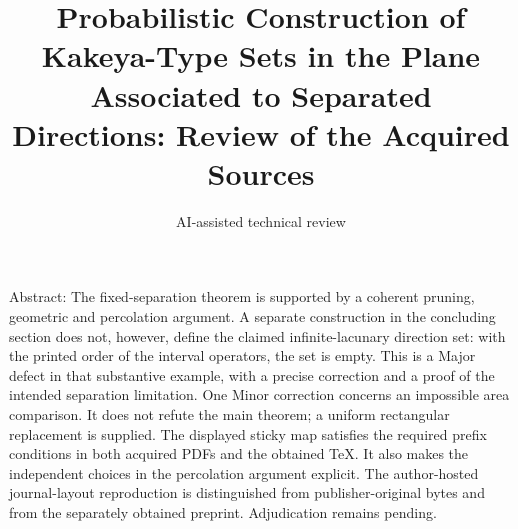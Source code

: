 \documentclass[10pt]{article}
\title{Probabilistic Construction of Kakeya-Type Sets in the Plane Associated to Separated Directions:
Review of the Acquired Sources}
\author{AI-assisted technical review}
\date{}
\begin{document}
\maketitle
Abstract: The fixed-separation theorem is supported by a coherent pruning, geometric and percolation argument. A separate construction in the concluding section does not, however, define the claimed infinite-lacunary direction set: with the printed order of the interval operators, the set is empty. This is a Major defect in that substantive example, with a precise correction and a proof of the intended separation limitation. One Minor correction concerns an impossible area comparison. It does not refute the main theorem; a uniform rectangular replacement is supplied. The displayed sticky map satisfies the required prefix conditions in both acquired PDFs and the obtained TeX. It also makes the independent choices in the percolation argument explicit. The author-hosted journal-layout reproduction is distinguished from publisher-original bytes and from the separately obtained preprint. Adjudication remains pending.\par
\end{document}
